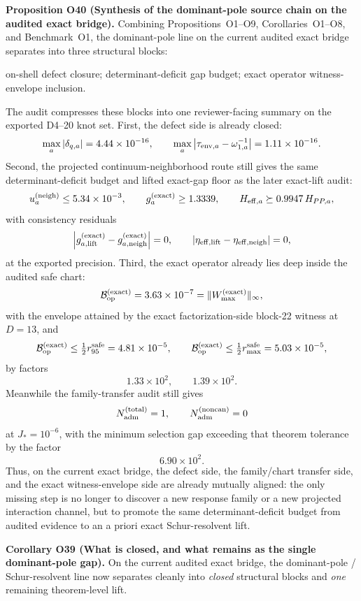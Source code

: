 \documentclass[aps,prd,onecolumn,notitlepage,nofootinbib,superscriptaddress,11pt,floatfix]{revtex4-2}
\begin{document}
\medskip\noindent\textbf{Proposition O40 (Synthesis of the dominant-pole source chain on the audited exact bridge).}
Combining Propositions~O1--O9, Corollaries~O1--O8, and Benchmark~O1, the dominant-pole line on the current audited exact bridge separates into three structural blocks:
\begin{center}
on-shell defect closure; determinant-deficit gap budget; exact operator witness-envelope inclusion.
\end{center}
The audit
compresses these blocks into one reviewer-facing summary on the exported D4--20 knot set.  First, the defect side is already closed:
\[
\max_a|\delta_{q,a}|=4.44\times10^{-16},
\qquad
\max_a\left|\tau_{{\rm env},a}-\omega_{1,a}^{-1}\right|=1.11\times10^{-16}.
\]
Second, the projected continuum-neighborhood route still gives the same determinant-deficit budget and lifted exact-gap floor as the later exact-lift audit:
\[
u_a^{(\mathrm{neigh})}\le 5.34\times10^{-3},
\qquad
g_a^{\rm(exact)}\ge 1.3339,
\qquad
H_{{\rm eff},a}\succeq 0.9947\,H_{PP,a},
\]
with consistency residuals
\[
\left|g_{a,\mathrm{lift}}^{\rm(exact)}-g_{a,\mathrm{neigh}}^{\rm(exact)}\right|=0,
\qquad
\left|\eta_{{\rm eff},\mathrm{lift}}-\eta_{{\rm eff},\mathrm{neigh}}\right|=0,
\]
at the exported precision.  Third, the exact operator already lies deep inside the audited safe chart:
\[
\mathcal B_{\rm op}^{\rm(exact)}=3.63\times10^{-7}
=\|W_{\max}^{\rm(exact)}\|_\infty,
\]
with the envelope attained by the exact factorization-side block-22 witness at \(D=13\), and
\[
\mathcal B_{\rm op}^{\rm(exact)}
\le \tfrac12 r_{95}^{\rm safe}=4.81\times10^{-5},
\qquad
\mathcal B_{\rm op}^{\rm(exact)}
\le \tfrac12 r_{\max}^{\rm safe}=5.03\times10^{-5},
\]
by factors
\[
1.33\times10^{2},
\qquad
1.39\times10^{2}.
\]
Meanwhile the family-transfer audit still gives
\[
N_{\rm adm}^{\rm(total)}=1,
\qquad
N_{\rm adm}^{\rm(noncan)}=0
\]
at \(J_\ast=10^{-6}\), with the minimum selection gap exceeding that theorem tolerance by the factor
\[
6.90\times10^{2}.
\]
Thus, on the current exact bridge, the defect side, the family/chart transfer side, and the exact witness-envelope side are already mutually aligned: the only missing step is no longer to discover a new response family or a new projected interaction channel, but to promote the same determinant-deficit budget from audited evidence to an a priori exact Schur-resolvent lift.

\medskip\noindent\textbf{Corollary O39 (What is closed, and what remains as the single dominant-pole gap).}
On the current audited exact bridge, the dominant-pole / Schur-resolvent line now separates cleanly into \emph{closed} structural blocks and \emph{one} remaining theorem-level lift.
\end{document}
